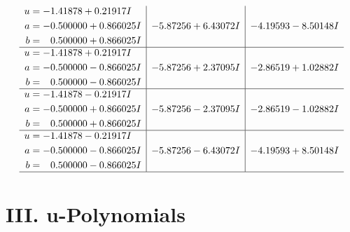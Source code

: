 \documentclass[1p]{elsarticle_modified}
\theoremstyle{definition}
\begin{document}
$$\begin{array}{c|c|c}
\begin{aligned}
u &= -1.41878 + 0.21917 I \\
a &= -0.500000 + 0.866025 I \\
b &= \phantom{-}0.500000 + 0.866025 I\end{aligned}
 & -5.87256 + 6.43072 I & -4.19593 - 8.50148 I \\ \hline\begin{aligned}
u &= -1.41878 + 0.21917 I \\
a &= -0.500000 - 0.866025 I \\
b &= \phantom{-}0.500000 - 0.866025 I\end{aligned}
 & -5.87256 + 2.37095 I & -2.86519 + 1.02882 I \\ \hline\begin{aligned}
u &= -1.41878 - 0.21917 I \\
a &= -0.500000 + 0.866025 I \\
b &= \phantom{-}0.500000 + 0.866025 I\end{aligned}
 & -5.87256 - 2.37095 I & -2.86519 - 1.02882 I \\ \hline\begin{aligned}
u &= -1.41878 - 0.21917 I \\
a &= -0.500000 - 0.866025 I \\
b &= \phantom{-}0.500000 - 0.866025 I\end{aligned}
 & -5.87256 - 6.43072 I & -4.19593 + 8.50148 I\\
 \hline 
 \end{array}$$\newpage
\newpage\renewcommand{\arraystretch}{1}
\centering \section*{ III. u-Polynomials}
\end{document}
